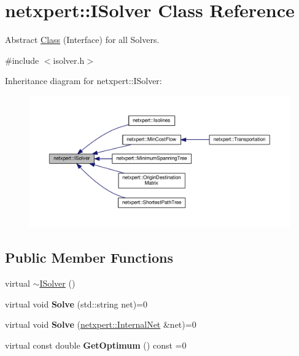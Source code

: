 \hypertarget{classnetxpert_1_1ISolver}{}\section{netxpert\+:\+:I\+Solver Class Reference}
\label{classnetxpert_1_1ISolver}


Abstract \hyperlink{classClass}{Class} (Interface) for all Solvers.  




{\ttfamily \#include $<$isolver.\+h$>$}



Inheritance diagram for netxpert\+:\+:I\+Solver\+:\nopagebreak
\begin{figure}[H]
\begin{center}
\leavevmode
\includegraphics[width=350pt]{classnetxpert_1_1ISolver__inherit__graph}
\end{center}
\end{figure}
\subsection*{Public Member Functions}
\begin{DoxyCompactItemize}
\item 
virtual \hyperlink{classnetxpert_1_1ISolver_adb78f899fbaec49ffd6df5bfd0528074}{$\sim$\+I\+Solver} ()
\item 
virtual void {\bfseries Solve} (std\+::string net)=0\hypertarget{classnetxpert_1_1ISolver_a7b7b8a1f684b832f33bab453020b1b4d}{}\label{classnetxpert_1_1ISolver_a7b7b8a1f684b832f33bab453020b1b4d}

\item 
virtual void {\bfseries Solve} (\hyperlink{classnetxpert_1_1InternalNet}{netxpert\+::\+Internal\+Net} \&net)=0\hypertarget{classnetxpert_1_1ISolver_aaa10dfba4e9fa72426ce15c925cd9176}{}\label{classnetxpert_1_1ISolver_aaa10dfba4e9fa72426ce15c925cd9176}

\item 
virtual const double {\bfseries Get\+Optimum} () const =0\hypertarget{classnetxpert_1_1ISolver_a234f67574e3402388046b224497c9c1e}{}\label{classnetxpert_1_1ISolver_a234f67574e3402388046b224497c9c1e}

\end{DoxyCompactItemize}


